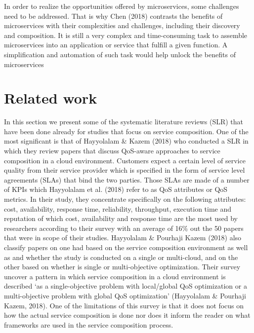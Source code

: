 \documentclass{article}
\begin{document}
In order to realize the opportunities offered by microservices, some challenges need to be addressed. That is why Chen (2018) contrasts the benefits of microservices with their complexities and challenges, including their discovery and composition. It is still a very complex and time-consuming task to assemble microservices into an application or service that fulfill a given function. A simplification and automation of such task would help unlock the benefits of microservices

\section{Related work}
In this section we present some of the systematic literature reviews (SLR) that have been done already for studies that focus on service composition. One of the most significant is that of Hayyolalam \& Kazem (2018)  who conducted a SLR in which they review papers that discuss QoS-aware approaches to service composition in a cloud environment. Customers expect a certain level of service quality from their service provider which is specified in the form of service level agreements (SLAs) that bind the two parties. Those SLAs are made of a number of KPIs which Hayyolalam et al. (2018) refer to as QoS attributes or QoS metrics. In their study, they concentrate specifically on the following attributes: cost, availability, response time, reliability, throughput, execution time and reputation of which cost, availability and response time are the most used by researchers according to their survey with an average of 16\% out the 50 papers that were in scope of their studies. Hayyolalam \& Pourhaji Kazem (2018) also classify papers on one had based on the service composition environment as well as and whether the study is conducted on a single or multi-cloud, and on the other based on whether is single or multi-objective optimization. Their survey uncover a pattern in which service composition in a cloud environment is described ‘as a single-objective problem with local/global QoS optimization or a multi-objective problem with global QoS optimization’ (Hayyolalam \& Pourhaji Kazem, 2018). One of the limitations of this survey is that it does not focus on how the actual service composition is done nor does it inform the reader on what frameworks are used in the service composition process. 
\end{document}
